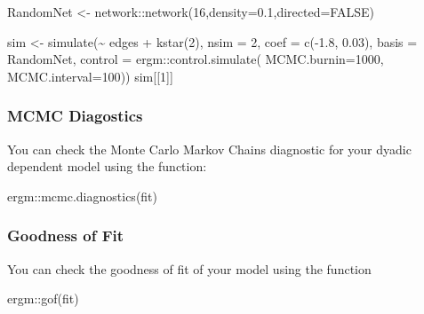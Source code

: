 \documentclass[
]{article}
\newenvironment{Shaded}{\begin{snugshade}}{\end{snugshade}}
\newcommand{\AttributeTok}[1]{\textcolor[rgb]{0.77,0.63,0.00}{#1}}
\newcommand{\ConstantTok}[1]{\textcolor[rgb]{0.00,0.00,0.00}{#1}}
\newcommand{\DecValTok}[1]{\textcolor[rgb]{0.00,0.00,0.81}{#1}}
\newcommand{\FloatTok}[1]{\textcolor[rgb]{0.00,0.00,0.81}{#1}}
\newcommand{\FunctionTok}[1]{\textcolor[rgb]{0.00,0.00,0.00}{#1}}
\newcommand{\NormalTok}[1]{#1}
\newcommand{\OtherTok}[1]{\textcolor[rgb]{0.56,0.35,0.01}{#1}}
\newcommand{\SpecialCharTok}[1]{\textcolor[rgb]{0.00,0.00,0.00}{#1}}
\begin{document}
\begin{Shaded}
\begin{Highlighting}[]

\NormalTok{RandomNet }\OtherTok{\textless{}{-}}\NormalTok{ network}\SpecialCharTok{::}\FunctionTok{network}\NormalTok{(}\DecValTok{16}\NormalTok{,}\AttributeTok{density=}\FloatTok{0.1}\NormalTok{,}\AttributeTok{directed=}\ConstantTok{FALSE}\NormalTok{)}

\NormalTok{sim }\OtherTok{\textless{}{-}} \FunctionTok{simulate}\NormalTok{(}\SpecialCharTok{\textasciitilde{}}\NormalTok{ edges }\SpecialCharTok{+} \FunctionTok{kstar}\NormalTok{(}\DecValTok{2}\NormalTok{), }\AttributeTok{nsim =} \DecValTok{2}\NormalTok{, }\AttributeTok{coef =} \FunctionTok{c}\NormalTok{(}\SpecialCharTok{{-}}\FloatTok{1.8}\NormalTok{, }\FloatTok{0.03}\NormalTok{),}
                  \AttributeTok{basis =}\NormalTok{ RandomNet,}
                  \AttributeTok{control =}\NormalTok{ ergm}\SpecialCharTok{::}\FunctionTok{control.simulate}\NormalTok{(}
                    \AttributeTok{MCMC.burnin=}\DecValTok{1000}\NormalTok{,}
                    \AttributeTok{MCMC.interval=}\DecValTok{100}\NormalTok{))}
\NormalTok{sim[[}\DecValTok{1}\NormalTok{]]}
\end{Highlighting}
\end{Shaded}

\hypertarget{mcmc-diagostics}{%
\subsubsection{MCMC Diagostics}\label{mcmc-diagostics}}

You can check the Monte Carlo Markov Chains diagnostic for your dyadic
dependent model using the function:

\begin{Shaded}
\begin{Highlighting}[]
\NormalTok{ergm}\SpecialCharTok{::}\FunctionTok{mcmc.diagnostics}\NormalTok{(fit)}
\end{Highlighting}
\end{Shaded}

\hypertarget{goodness-of-fit}{%
\subsubsection{Goodness of Fit}\label{goodness-of-fit}}

You can check the goodness of fit of your model using the function

\begin{Shaded}
\begin{Highlighting}[]
\NormalTok{ergm}\SpecialCharTok{::}\FunctionTok{gof}\NormalTok{(fit)}
\end{Highlighting}
\end{Shaded}
\end{document}
